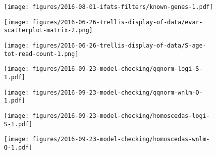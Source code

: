 \documentclass[letterpaper]{article}
\begin{document}
\begin{figure}
\begin{center}
\texttt{[image: figures/2016-08-01-ifats-filters/known-genes-1.pdf]}
\caption{}
\label{fig:known-genes}
\end{center}
\end{figure}

\begin{figure}
\begin{center}
\texttt{[image: figures/2016-06-26-trellis-display-of-data/evar-scatterplot-matrix-2.png]}
\end{center}
\caption{}
\label{fig:predictor-associations}
\end{figure}

\begin{figure}
\begin{center}
\texttt{[image: figures/2016-06-26-trellis-display-of-data/S-age-tot-read-count-1.png]}
\end{center}
\caption{}
\label{fig:weight-of-evidence}
\end{figure}

\begin{figure}
\begin{center}
\texttt{[image: figures/2016-09-23-model-checking/qqnorm-logi-S-1.pdf]}
\end{center}
\caption{}
\label{fig:qqnorm-logi.S}
\end{figure}

\begin{figure}
\begin{center}
\texttt{[image: figures/2016-09-23-model-checking/qqnorm-wnlm-Q-1.pdf]}
\end{center}
\caption{}
\label{fig:qqnorm-wnlm.Q}
\end{figure}

\begin{figure}
\begin{center}
\texttt{[image: figures/2016-09-23-model-checking/homoscedas-logi-S-1.pdf]}
\end{center}
\caption{}
\label{fig:homoscedas-logi.S}
\end{figure}

\begin{figure}
\begin{center}
\texttt{[image: figures/2016-09-23-model-checking/homoscedas-wnlm-Q-1.pdf]}
\end{center}
\caption{}
\label{fig:homoscedas-wnlm.Q}
\end{figure}
\end{document}
